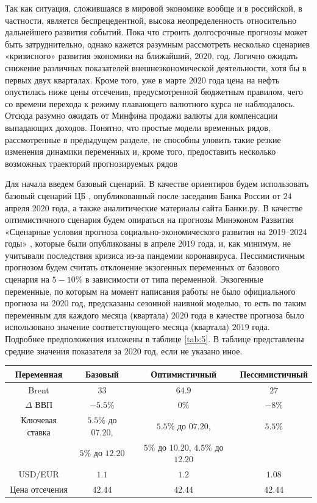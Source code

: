 \documentclass[a4paper, 14pt]{extarticle}
\begin{document}
Так как ситуация, сложившаяся в мировой экономике вообще и в российской, в частности, является беспрецедентной, высока неопределенность относительно дальнейшего развития событий.
Пока что строить долгосрочные прогнозы может быть затруднительно, однако кажется разумным рассмотреть несколько сценариев «кризисного» развития экономики на ближайший, $2020$, год.
Логично ожидать снижение различных показателей внешнеэкономической деятельности, хотя бы в первых двух кварталах.
Кроме того, уже в марте $2020$ года цена на нефть опустилась ниже цены отсечения, предусмотренной бюджетным правилом, чего со времени перехода к режиму плавающего валютного курса не наблюдалось.
Отсюда разумно ожидать от Минфина продажи валюты для компенсации выпадающих доходов.
Понятно, что простые модели временных рядов, рассмотренные в предыдущем разделе, не способны уловить такие резкие изменения динамики переменных и, кроме того, предоставить несколько возможных траекторий прогнозируемых рядов

Для начала введем базовый сценарий.
В качестве ориентиров будем использовать базовый сценарий ЦБ \cite{cbr2020}, опубликованный после заседания Банка России от $24$ апреля $2020$ года, а также  аналитические материалы сайта Банки.ру.
В качестве оптимистичного сценария будем опираться на прогнозы Минэконом Развития «Сценарные условия прогноза социально-экономического
развития на 2019–2024 годы» \cite{minec2019}, которые были опубликованы в апреле $2019$ года, и, как минимум, не учитывали последствия кризиса из-за пандемии коронавируса.
Пессимистичным прогнозом будем считать отклонение экзогенных переменных от базового сценария на $5-10 \%$  в зависимости от типа переменной.
Экзогенные переменные, по которым на момент написания работы не было официального прогноза на $2020$ год, предсказаны сезонной наивной моделью, то есть по таким переменным для каждого месяца (квартала) $2020$ года в качестве прогноза было использовано значение соответствующего месяца (квартала) $2019$ года. 
Подробнее предположения изложены в таблице \ref{tab:5}.  
В таблице представлены средние значения показателя за $2020$ год, если не указано иное.

\begin{center}
	\small
		\begin{tabular}{c| c | c | c}
		Переменная & Базовый & Оптимистичный & Пессимистичный \\
		\toprule
		 Brent & $33$ & $ 64.9$ & $27$ \\
		$\Delta$ ВВП &  $-5.5 \%$  & $0\%$ &  $-8\%$  \\
		Ключевая ставка &  $5.5 \%$ до $07.20$,  & $5.5 \%$ до $07.20$, &  $5.5 \%$\\
		&$5 \%$ до $12.20$ & $5 \%$ до $10.20$, $4.5 \%$ до $12.20$ & \\
		USD/EUR & $1.1$ & $1.2$ & $1.08$ \\
		Цена отсечения & $42.44$ & $42.44$ & $42.44$\\
		\bottomrule
	\end{tabular}
	\label{tab:5}
	\normalsize
\end{center}
\end{document}
